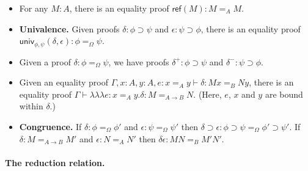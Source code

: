 \documentclass{easychair}
\newcommand{\univ}[4]{\mathsf{univ}_{{#1},{#2}} \left( {#3} , {#4} \right)}
\newcommand{\triplelambda}{\lambda \!\! \lambda \!\! \lambda}
\newcommand{\reff}[1]{\mathsf{ref} \left( {#1} \right)}
\begin{document}
\begin{itemize}
\item
For any $M : A$, there is an equality proof $\reff{M} : M =_A M$.
\item
\textbf{Univalence.}  Given proofs $\delta : \phi \supset \psi$ and $\epsilon : \psi \supset \phi$, there is an equality proof
$\univ{\phi}{\psi}{\delta}{\epsilon} : \phi =_\Omega \psi$.
\item
Given a proof $\delta : \phi =_\Omega \psi$, we have proofs $\delta^+ : \phi \supset \psi$ and $\delta^- : \psi \supset \phi$.
\item
Given an equality proof $\Gamma, x : A, y : A, e : x =_A y \vdash \delta : Mx =_B Ny$, there is an equality proof $\Gamma \vdash \triplelambda e : x=_Ay . \delta : M =_{A \rightarrow B} N$.  (Here, $e$, $x$ and $y$ are bound within $\delta$.)
\item
\textbf{Congruence.}
If $\delta : \phi =_\Omega \phi'$ and $\epsilon : \psi =_\Omega \psi'$ then $\delta \supset \epsilon : \phi \supset \psi =_\Omega \phi' \supset \psi'$.  If $\delta : M =_{A \rightarrow B} M'$ and $\epsilon : N =_A N'$ then $\delta \epsilon : MN =_B M'N'$.
\end{itemize}

\paragraph{The reduction relation.}
\end{document}
